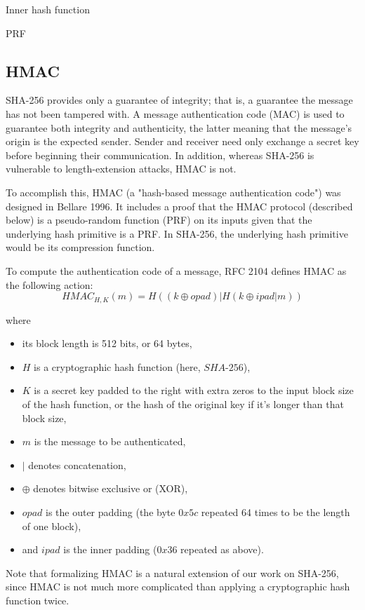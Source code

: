 \documentclass[twocolumn,showpacs,%
  nofootinbib,aps,superscriptaddress,%
  eqsecnum,prd,notitlepage,showkeys,10pt]{revtex4-1}
\begin{document}
Inner hash function

PRF

\subsection{HMAC}

SHA-256 provides only a guarantee of integrity; that is, a guarantee the message has not been tampered with. A message authentication code (MAC) is used to guarantee both integrity and authenticity, the latter meaning that the message's origin is the expected sender. Sender and receiver need only exchange a secret key before beginning their communication. In addition, whereas SHA-256 is vulnerable to length-extension attacks, HMAC is not.

To accomplish this, HMAC (a "hash-based message authentication code") was designed in Bellare 1996. It includes a proof that the HMAC protocol (described below) is a pseudo-random function (PRF) on its inputs given that the underlying hash primitive is a PRF. In SHA-256, the underlying hash primitive would be its compression function.

To compute the authentication code of a message, RFC 2104 defines HMAC as the following action:
$$HMAC_{H, K}(m) = H ( (k \oplus opad) | H ( k \oplus ipad | m )  ) $$

where

\begin{itemize}
\item its block length is 512 bits, or 64 bytes,
\item $H$ is a cryptographic hash function (here, $SHA$-$256$),
\item $K$ is a secret key padded to the right with extra zeros to the input block size of the hash function, or the hash of the original key if it's longer than that block size, 
\item $m$ is the message to be authenticated, 
\item $|$ denotes concatenation, 
\item $\oplus$ denotes bitwise exclusive or (XOR), 
\item $opad$ is the outer padding (the byte $0x5c$ repeated 64 times to be the length of one block), 
\item and $ipad$ is the inner padding ($0x36$ repeated as above).
\end{itemize}

Note that formalizing HMAC is a natural extension of our work on SHA-256, since HMAC is not much more complicated than applying a cryptographic hash function twice. 
\end{document}
